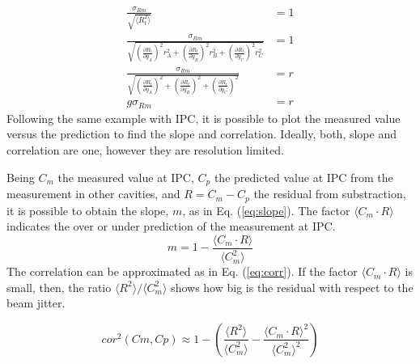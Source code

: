 \begin{align}
 \frac{\sigma_{Rm}}{\sqrt{\langle R_t^2\rangle}}&=1\\
 \frac{\sigma_{Rm}}{\sqrt{\left(\frac{\partial R_t}{\partial y_A}\right)^2r_A^2+\left(\frac{\partial R_t}{\partial y_B}\right)^2r_B^2+\left(\frac{\partial R_t}{\partial y_C}\right)^2r_C^2}}&=1\label{eq:allr}\\
 \frac{\sigma_{Rm}}{\sqrt{\left(\frac{\partial R_t}{\partial y_A}\right)^2+\left(\frac{\partial R_t}{\partial y_B}\right)^2+\left(\frac{\partial R_t}{\partial y_C}\right)^2}}&=r\label{eq:samer}\\
 g\sigma_{Rm}&=r
\end{align}
Following the same example with IPC, it is possible to plot the measured value versus the prediction to find the slope and correlation. Ideally, both, slope and correlation are one, however they are resolution limited.\par
Being $C_m$ the measured value at IPC, $C_p$ the predicted value at IPC from the measurement in other cavities, and $R=C_m-C_p$ the residual from substraction, it is possible to obtain the slope, $m$, as in Eq. (\ref{eq:slope}). The factor $\langle  C_m\cdot R\rangle$ indicates the over or under prediction of the measurement at IPC.
\begin{equation}
 m=1-\frac{\langle C_m\cdot R\rangle}{\langle C_m^2\rangle}\label{eq:slope}
\end{equation}
The correlation can be approximated as in Eq. (\ref{eq:corr}). If the factor $\langle  C_m\cdot R\rangle$ is small, then, the ratio $\langle R^2\rangle/\langle C_m^2\rangle$ shows how big is the residual with respect to the beam jitter.\par
\begin{equation}
 cor^2(Cm,Cp)\approx 1-\left(\frac{\langle R^2\rangle}{\langle C_m^2\rangle}-\frac{\langle C_m\cdot R\rangle^2}{\langle C_m^2\rangle^2}\right)\label{eq:corr}
\end{equation}

